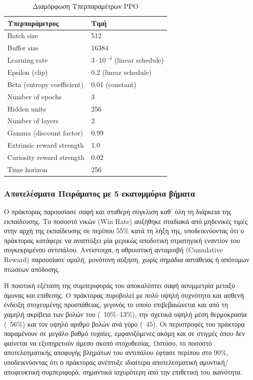 \documentclass[12pt]{article}
\begin{document}
\begin{table}[H]
\centering
\caption{Διαμόρφωση Υπερπαραμέτρων PPO}
\label{tab:ppo-config}
\begin{tabular}{ll}
\hline
\textbf{Υπερπαράμετρος} & \textbf{Τιμή} \\
\hline
Batch size & 512 \\
Buffer size & 16384 \\
Learning rate & $3 \cdot 10^{-4}$ (linear schedule) \\
Epsilon (clip) & 0.2 (linear schedule) \\
Beta (entropy coefficient) & 0.01 (constant) \\
Number of epochs & 3 \\
Hidden units & 256 \\
Number of layers & 2 \\
Gamma (discount factor) & 0.99 \\
Extrinsic reward strength & 1.0 \\
Curiosity reward strength & 0.02 \\
Time horizon & 256 \\
\hline
\end{tabular}
\end{table}

\subsubsection{Αποτελέσματα Πειράματος με 5 εκατομμύρια βήματα}
Ο πράκτορας παρουσίασε σαφή και σταθερή σύγκλιση καθ' όλη τη διάρκεια της εκπαίδευσης. Το ποσοστό νικών (Win Rate) αυξήθηκε σταδιακά από μηδενικές τιμές στην αρχή της εκπαίδευσης σε περίπου 55\% κατά τη λήξη της, υποδεικνύοντας ότι ο πράκτορας κατάφερε να αναπτύξει μία μερικώς αποδοτική στρατηγική εναντίον του συγκεκριμένου αντιπάλου. Αντίστοιχα, η αθροιστική ανταμοιβή (Cumulative Reward) παρουσίασε ομαλή, μονότονη αύξηση, χωρίς σημάδια αστάθειας ή απότομων πτώσεων απόδοσης.

Η ποιοτική εξέταση της συμπεριφοράς του αποκαλύπτει σαφή ασυμμετρία μεταξύ άμυνας και επίθεσης. Ο πράκτορας πυροβολεί με πολύ υψηλή συχνότητα και ασθενή ένδειξη στοχευμένης προσπάθειας, γεγονός το οποίο επιβεβαιώνεται και από τη χαμηλή ακρίβεια των βολών του (~10\%–13\%), την σχετικά υψηλή μέση θερμοκρασία (~56\%) και τον υψηλό αριθμό βολών ανά γύρο (~45). Οι περιστροφές του πράκτορα παραμένουν σε μεγάλο βαθμό τυχαίες, εμφανιζόμενες ακόμη και σε στιγμές όπου δεν φαίνεται να εξυπηρετούν άμεσο σκοπό στοχοθεσίας. Ωστόσο, το ποσοστό αποτελεσματικής αποφυγής βλημάτων του αντιπάλου έφτασε περίπου στο 90\%, υποδεικνύοντας ότι ο πράκτορας ανέπτυξε ιδιαίτερα αποτελεσματική αμυντική/αποφευκτική συμπεριφορά, σημαντικά ισχυρότερη από την επιθετική του ικανότητα.
\end{document}
